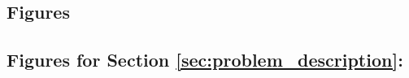 \documentclass[12pt]{article}
\begin{document}
\begin{appendices}

		
		\newpage
		\section{Figures} \label{app:figures}
		
		\subsection{Figures for Section \ref{sec:problem_description}: } \label{sapp:figures_problem_description}
		

\end{appendices}
\end{document}
